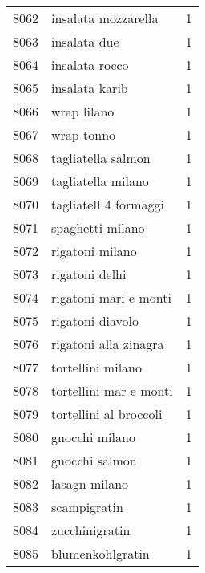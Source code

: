\begin{tabular}{llr}
8062 &                                insalata mozzarella &      1 \\
8063 &                                       insalata due &      1 \\
8064 &                                     insalata rocco &      1 \\
8065 &                                     insalata karib &      1 \\
8066 &                                        wrap lilano &      1 \\
8067 &                                         wrap tonno &      1 \\
8068 &                                 tagliatella salmon &      1 \\
8069 &                                 tagliatella milano &      1 \\
8070 &                              tagliatell 4 formaggi &      1 \\
8071 &                                   spaghetti milano &      1 \\
8072 &                                    rigatoni milano &      1 \\
8073 &                                     rigatoni delhi &      1 \\
8074 &                              rigatoni mari e monti &      1 \\
8075 &                                   rigatoni diavolo &      1 \\
8076 &                              rigatoni alla zinagra &      1 \\
8077 &                                  tortellini milano &      1 \\
8078 &                             tortellini mar e monti &      1 \\
8079 &                             tortellini al broccoli &      1 \\
8080 &                                     gnocchi milano &      1 \\
8081 &                                     gnocchi salmon &      1 \\
8082 &                                      lasagn milano &      1 \\
8083 &                                       scampigratin &      1 \\
8084 &                                     zucchinigratin &      1 \\
8085 &                                   blumenkohlgratin &      1 \\

\end{tabular}
